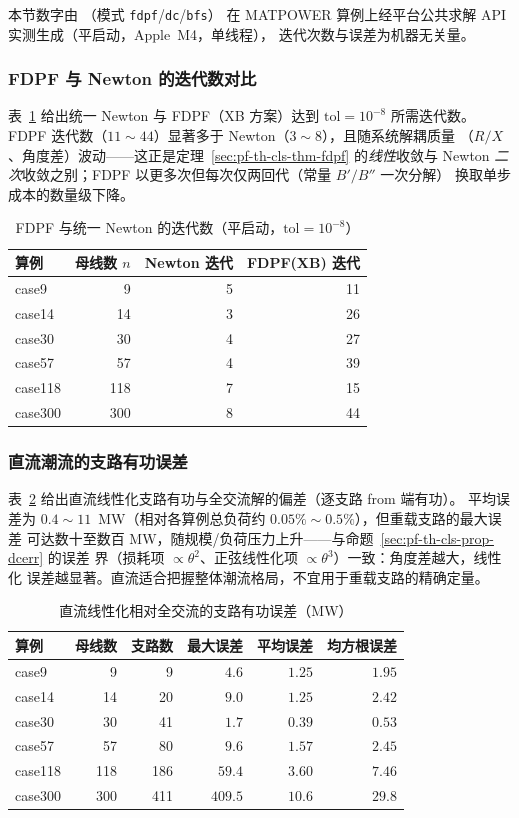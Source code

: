 本节数字由 （模式 \texttt{fdpf}/\texttt{dc}/\texttt{bfs}）
在 MATPOWER 算例上经平台公共求解 API 实测生成（平启动，Apple~M4，单线程），
迭代次数与误差为机器无关量。

\subsubsection{FDPF 与 Newton 的迭代数对比}
表~\ref{tab:pf-th-cls-fdpf} 给出统一 Newton 与 FDPF（XB 方案）达到 $\mathrm{tol}=10^{-8}$
所需迭代数。FDPF 迭代数（$11\sim44$）显著多于 Newton（$3\sim8$），且随系统解耦质量
（$R/X$、角度差）波动——这正是定理~\ref{sec:pf-th-cls-thm-fdpf} 的\emph{线性}收敛与
Newton \emph{二次}收敛之别；FDPF 以更多次但每次仅两回代（常量 $B'/B''$ 一次分解）
换取单步成本的数量级下降。
\begin{table}[H]\centering\footnotesize
\caption{FDPF 与统一 Newton 的迭代数（平启动，$\mathrm{tol}=10^{-8}$）}
\label{tab:pf-th-cls-fdpf}
\begin{tabular}{@{}lrrr@{}}
\toprule
算例 & 母线数 $n$ & Newton 迭代 & FDPF(XB) 迭代\\
\midrule
case9   & 9   & 5 & 11\\
case14  & 14  & 3 & 26\\
case30  & 30  & 4 & 27\\
case57  & 57  & 4 & 39\\
case118 & 118 & 7 & 15\\
case300 & 300 & 8 & 44\\
\bottomrule
\end{tabular}
\end{table}

\subsubsection{直流潮流的支路有功误差}
表~\ref{tab:pf-th-cls-dc} 给出直流线性化支路有功与全交流解的偏差（逐支路 from 端有功）。
平均误差为 $0.4\sim11$~MW（相对各算例总负荷约 $0.05\%\sim0.5\%$），但重载支路的最大误差
可达数十至数百 MW，随规模/负荷压力上升——与命题~\ref{sec:pf-th-cls-prop-dcerr} 的误差
界（损耗项 $\propto\theta^2$、正弦线性化项 $\propto\theta^3$）一致：角度差越大，线性化
误差越显著。直流适合把握整体潮流格局，不宜用于重载支路的精确定量。
\begin{table}[H]\centering\footnotesize
\caption{直流线性化相对全交流的支路有功误差（MW）}
\label{tab:pf-th-cls-dc}
\begin{tabular}{@{}lrrrrr@{}}
\toprule
算例 & 母线数 & 支路数 & 最大误差 & 平均误差 & 均方根误差\\
\midrule
case9   & 9   & 9   & $4.6$   & $1.25$ & $1.95$\\
case14  & 14  & 20  & $9.0$   & $1.25$ & $2.42$\\
case30  & 30  & 41  & $1.7$   & $0.39$ & $0.53$\\
case57  & 57  & 80  & $9.6$   & $1.57$ & $2.45$\\
case118 & 118 & 186 & $59.4$  & $3.60$ & $7.46$\\
case300 & 300 & 411 & $409.5$ & $10.6$ & $29.8$\\
\bottomrule
\end{tabular}
\end{table}

